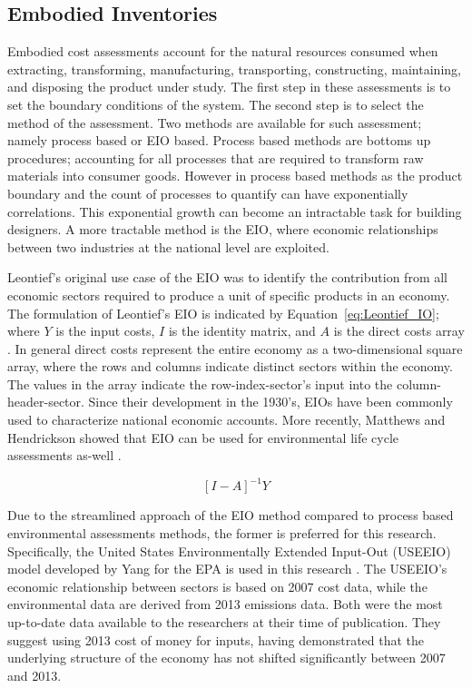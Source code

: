     \subsection{Embodied Inventories}
    \label{sec: embodied}
    Embodied cost assessments account for the natural resources consumed when extracting, transforming, manufacturing, transporting, constructing, maintaining, and disposing the product under study. The first step in these assessments is to set the boundary conditions of the system. The second step is to select the method of the assessment. Two methods are available for such assessment; namely process based or EIO based. Process based methods are bottoms up procedures; accounting for all processes that are required to transform raw materials into consumer goods. However in process based methods as the product boundary and the count of processes to quantify can have exponentially correlations. This exponential growth can become an intractable task for building designers. A more tractable method is the EIO, where economic relationships between two industries at the national level are exploited. 
    
    Leontief's original use case of the EIO was to identify the contribution from all economic sectors required to produce a unit of specific products in an economy.  The formulation of Leontief's EIO is indicated by Equation~\ref{eq:Leontief_IO}; where $Y$ is the input costs, $I$ is the identity matrix, and $A$ is the direct costs array \cite{matthews15}. In general direct costs represent the entire economy as a two-dimensional square array, where the rows and columns indicate distinct sectors within the economy. The values in the array indicate the row-index-sector’s input into the column-header-sector. Since their development in the 1930's, EIOs have been commonly used to characterize national economic accounts. More recently, Matthews and Hendrickson showed that EIO can be used for environmental life cycle assessments as-well \cite{matthews15}.  
    
        \begin{equation} \label{eq:Leontief_IO}
            [I-A]^{-1}Y
        \end{equation}
   
    Due to the streamlined approach of the EIO method compared to process based environmental assessments methods, the former is preferred for this research. Specifically, the United States Environmentally Extended Input-Out (USEEIO) model developed by Yang for the EPA is used in this research \cite{yang17}. The USEEIO’s economic relationship between sectors is based on 2007 cost data, while the environmental data are derived from 2013 emissions data. Both were the most up-to-date data available to the researchers at their time of publication. They suggest using 2013 cost of money for inputs, having demonstrated that the underlying structure of the economy has not shifted significantly between 2007 and 2013. 
    
